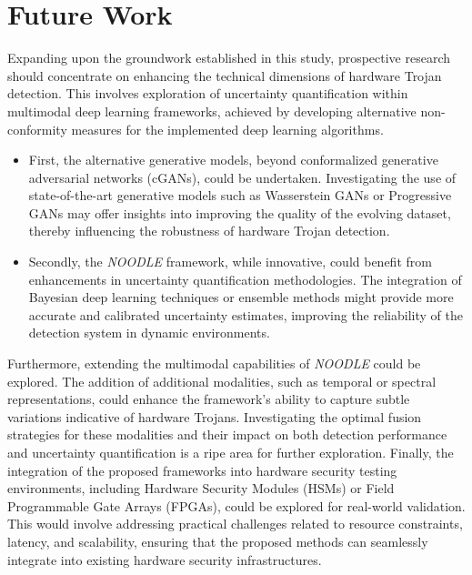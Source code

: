 \section*{Future Work}

Expanding upon the groundwork established in this study, prospective research should concentrate on enhancing the technical dimensions of hardware Trojan detection. This involves exploration of uncertainty quantification within multimodal deep learning frameworks, achieved by developing alternative non-conformity measures for the implemented deep learning algorithms. 

\begin{itemize}

\item First, the alternative generative models, beyond conformalized generative adversarial networks (cGANs), could be undertaken. Investigating the use of state-of-the-art generative models such as Wasserstein GANs or Progressive GANs may offer insights into improving the quality of the evolving dataset, thereby influencing the robustness of hardware Trojan detection.

\item Secondly, the \textit{NOODLE} framework, while innovative, could benefit from enhancements in uncertainty quantification methodologies. The integration of Bayesian deep learning techniques or ensemble methods might provide more accurate and calibrated uncertainty estimates, improving the reliability of the detection system in dynamic environments.
\end{itemize}

Furthermore, extending the multimodal capabilities of \textit{NOODLE} could be explored. The addition of additional modalities, such as temporal or spectral representations, could enhance the framework's ability to capture subtle variations indicative of hardware Trojans. Investigating the optimal fusion strategies for these modalities and their impact on both detection performance and uncertainty quantification is a ripe area for further exploration. Finally, the integration of the proposed frameworks into hardware security testing environments, including Hardware Security Modules (HSMs) or Field Programmable Gate Arrays (FPGAs), could be explored for real-world validation. This would involve addressing practical challenges related to resource constraints, latency, and scalability, ensuring that the proposed methods can seamlessly integrate into existing hardware security infrastructures.

\endgroup
